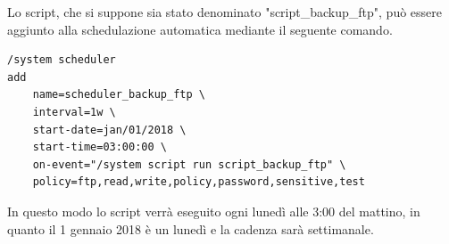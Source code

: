 \documentclass[Tesi.tex]{subfiles}
\begin{document}
Lo script, che si suppone sia stato denominato "script\_backup\_ftp", può essere aggiunto alla schedulazione automatica mediante il seguente comando. \\

\begin{lstlisting}[caption=Comando per la schedulazione del backup]
/system scheduler
add
	name=scheduler_backup_ftp \
	interval=1w \
	start-date=jan/01/2018 \
	start-time=03:00:00 \
	on-event="/system script run script_backup_ftp" \
	policy=ftp,read,write,policy,password,sensitive,test
\end{lstlisting}

In questo modo lo script verrà eseguito ogni lunedì alle 3:00 del mattino, in quanto il 1 gennaio 2018 è un lunedì e la cadenza sarà settimanale.
\end{document}
